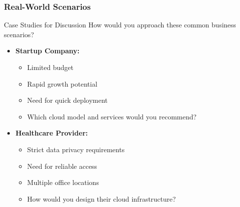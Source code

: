 \documentclass{beamer}
\begin{document}
\begin{frame}
    \frametitle{Real-World Scenarios}
    
    \begin{alertblock}{Case Studies for Discussion}
        How would you approach these common business scenarios?
    \end{alertblock}
    
    \begin{itemize}
        \item \textbf{Startup Company:}
        \begin{itemize}
            \item Limited budget
            \item Rapid growth potential
            \item Need for quick deployment
            \item Which cloud model and services would you recommend?
        \end{itemize}
        
        \item \textbf{Healthcare Provider:}
        \begin{itemize}
            \item Strict data privacy requirements
            \item Need for reliable access
            \item Multiple office locations
            \item How would you design their cloud infrastructure?
        \end{itemize}
    \end{itemize}
\end{frame}
\end{document}
